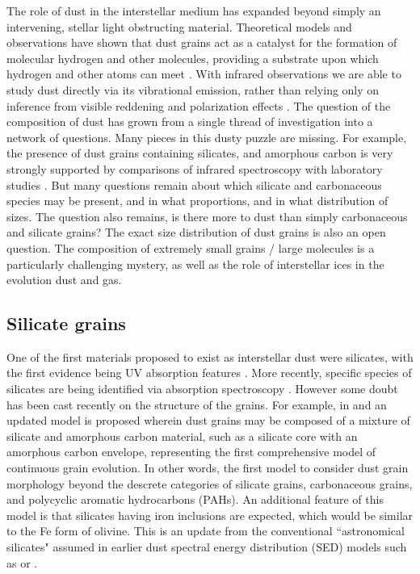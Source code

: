   The role of dust in the interstellar medium has expanded beyond simply an intervening, stellar light obstructing material. Theoretical models and observations have shown that dust grains act as a catalyst for the formation of molecular hydrogen and other molecules, providing a substrate upon which hydrogen and other atoms can meet \citep{iglesias77,burke83}. With infrared observations we are able to study dust directly via its vibrational emission, rather than relying only on inference from visible reddening and polarization effects \citep{davis51,platt56, carrasco73}.
   The question of the composition of dust has grown from a single thread of investigation into a network of questions. Many pieces in this dusty puzzle are missing. For example, the presence of dust grains containing silicates, and amorphous carbon is very strongly supported by comparisons of infrared spectroscopy with laboratory studies \citep{hagen79,joblin09}. But many questions remain about which silicate and carbonaceous species may be present, and in what proportions, and in what distribution of sizes. The question also remains, is there more to dust than simply carbonaceous and silicate grains?  The exact size distribution of dust grains is also an open question. The composition of extremely small grains / large molecules is a particularly challenging mystery, as well as the role of interstellar ices in the evolution dust and gas.

\subsection{Silicate grains}
     One of the first materials proposed to exist as interstellar dust were silicates, with the first evidence being UV absorption features \citep{knacke69}. More recently, specific species of silicates are being identified via absorption spectroscopy \citep{olofsson12}. However some doubt has been cast recently on the structure of the grains. For example, in \cite{jones13} and \cite{jones14} an updated model is proposed wherein dust grains may be composed of a mixture of silicate and amorphous carbon material, such as a silicate core with an amorphous carbon envelope, representing the first comprehensive model of continuous grain evolution. In other words, the first model to consider dust grain morphology beyond the descrete categories of silicate grains, carbonaceous grains, and polycyclic aromatic hydrocarbons (PAHs). An additional feature of this model is that silicates having iron inclusions are expected, which would be similar to the Fe form of olivine. This is an update from the conventional ``astronomical  silicates" assumed in earlier dust spectral energy distribution (SED) models such as \cite{li01} or \cite{dustem11}.

